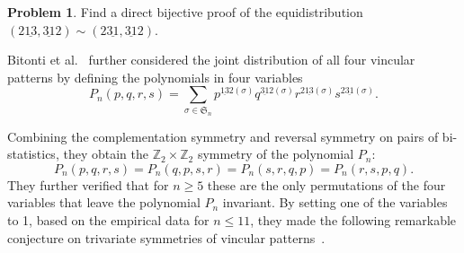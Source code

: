 \documentclass[12pt,reqno]{amsart}
\numberwithin{equation}{section}
\theoremstyle{plain}
\theoremstyle{definition}
\newtheorem{?}[theorem]{Problem}
\newcommand{\Z}{\mathbb{Z}}
\def\Sym{\mathfrak{S}}
\def\rasc{\mathrm{2\underline{13}}}
\def\rdes{\mathrm{2\underline{31}}}
\def\ldes{\mathrm{\underline{31}2}}
\def\lasc{\mathrm{\underline{13}2}}
\begin{document}
\begin{?}\label{problem.BDS}
Find a direct bijective proof of the equidistribution 
$(\rasc, \ldes)\sim (\rdes, \ldes)$.
\end{?}
 
Bitonti et al.~\cite{BDS24} further considered the joint distribution of all four vincular patterns
by defining  the polynomials in four variables
\begin{equation}
P_n(p,q,r,s)=\sum_{\sigma\in \Sym_n}p^{\lasc(\sigma)}q^{\ldes(\sigma)}
r^{\rasc(\sigma)}s^{\rdes(\sigma)}.
\end{equation}


Combining the complementation symmetry and reversal symmetry on pairs of bi-statistics, they obtain the $\Z_2\times \Z_2$ symmetry of the polynomial $P_n$:
\begin{equation}\label{bds-symmetries}
P_n(p,q,r,s)=P_n(q,p, s,r)=P_n(s,r, q,p)=P_n(r,s, p,q).
\end{equation}
They further  verified that for $n\geq 5$ these are the only permutations of the four variables that leave the polynomial $P_n$ invariant. By setting one of the variables to 1, based on the empirical data for $n\leq 11$, they  made the following remarkable conjecture on trivariate symmetries of vincular patterns~\cite[Conjecture 7.7]{BDS24}.
\end{document}
